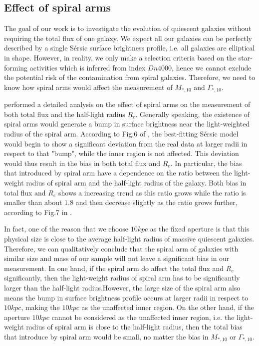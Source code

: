 \documentclass[fleqn,usenatbib]{mnras}
\begin{document}
\subsection{Effect of spiral arms}
The goal of our work is to investigate the evolution of quiescent galaxies without requiring the total flux of one galaxy. We expect all our galaxies can be perfectly described by a single S\'{e}rsic surface brightness profile, i.e. all galaxies are elliptical in shape. However, in reality, we only make a selection criteria based on the star-forming activities which is inferred from index $Dn4000$, hence we cannot exclude the potential risk of the contamination from spiral galaxies. Therefore, we need to know how spiral arms would affect the measurement of $M_{*,10}$ and $\Gamma_{*,10}$.
\par  \cite{Ale22_spiral} performed a detailed analysis on the effect of spiral arms on the measurement of both total flux and the half-light radius $R_e$. Generally speaking, the existence of spiral arms would generate a bump in surface brightness near the light-weighted radius of the spiral arm. According to Fig.6 of \cite{Ale22_spiral}, the best-fitting S\'{e}rsic model would begin to show a significant deviation from the real data at larger radii in respect to that "bump", while the inner region is not affected. This deviation would thus result in the bias in both total flux and $R_e$. In particular, the bias that introduced by spiral arm have a dependence on the ratio between the light-weight radius of spiral arm and the half-light radius of the galaxy. Both bias in total flux and $R_e$ shows a increasing trend as this ratio grows while the ratio is smaller than about $1.8$ and then decrease slightly as the ratio grows further, according to Fig.7 in \cite{Ale22_spiral}.
\par In fact, one of the reason that we choose $10kpc$ as the fixed aperture is that this physical size is close to the average half-light radius of massive quiescent galaxies. Therefore, we can qualitatively conclude that the spiral arm of galaxies with similar size and mass of our sample will not leave a significant bias in our measurement. In one hand, if the spiral arm do affect the total flux and $R_e$ significantly, then the light-weight radius of spiral arm has to be significantly larger than the half-light radius.However, the large size of the spiral arm also means the bump in surface brightness profile occurs at larger radii in respect to $10kpc$, making the $10kpc$ as the unaffected inner region. On the other hand, if the aperture $10kpc$ cannot be considered as the unaffected inner region, i.e. the light-weight radius of spiral arm is close to the half-light radius, then the total bias that introduce by spiral arm would be small, no matter the bias in $M_{*,10}$ or $\Gamma_{*,10}$.
\end{document}
